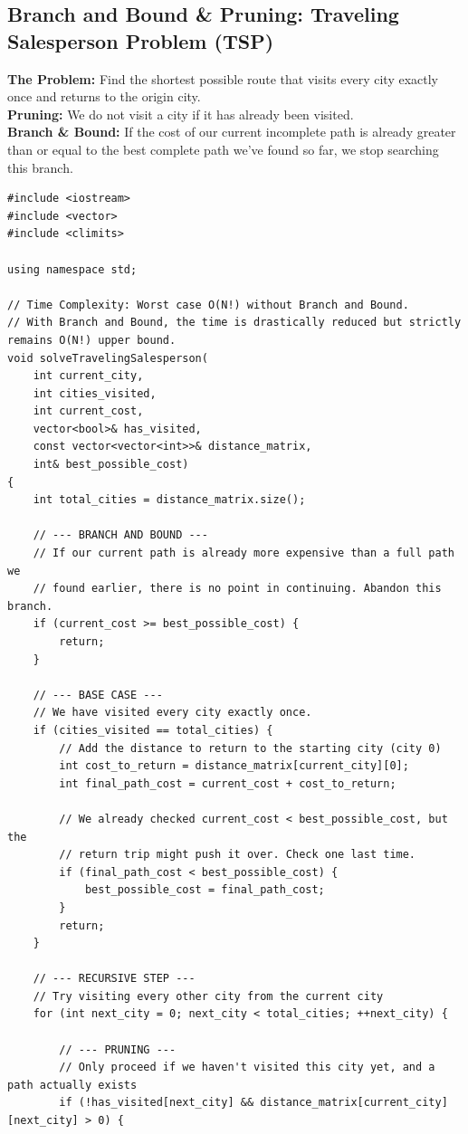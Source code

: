 \subsection{Branch and Bound \& Pruning: Traveling Salesperson Problem (TSP)}
\textbf{The Problem:} Find the shortest possible route that visits every city exactly once and returns to the origin city.
\\
\textbf{Pruning:} We do not visit a city if it has already been visited.
\\
\textbf{Branch \& Bound:} If the cost of our current incomplete path is already greater than or equal to the best complete path we've found so far, we stop searching this branch.

\begin{lstlisting}
#include <iostream>
#include <vector>
#include <climits>

using namespace std;

// Time Complexity: Worst case O(N!) without Branch and Bound.
// With Branch and Bound, the time is drastically reduced but strictly remains O(N!) upper bound.
void solveTravelingSalesperson(
    int current_city, 
    int cities_visited, 
    int current_cost, 
    vector<bool>& has_visited, 
    const vector<vector<int>>& distance_matrix, 
    int& best_possible_cost) 
{
    int total_cities = distance_matrix.size();
    
    // --- BRANCH AND BOUND ---
    // If our current path is already more expensive than a full path we 
    // found earlier, there is no point in continuing. Abandon this branch.
    if (current_cost >= best_possible_cost) {
        return;
    }

    // --- BASE CASE ---
    // We have visited every city exactly once.
    if (cities_visited == total_cities) {
        // Add the distance to return to the starting city (city 0)
        int cost_to_return = distance_matrix[current_city][0];
        int final_path_cost = current_cost + cost_to_return;
        
        // We already checked current_cost < best_possible_cost, but the 
        // return trip might push it over. Check one last time.
        if (final_path_cost < best_possible_cost) {
            best_possible_cost = final_path_cost;
        }
        return;
    }

    // --- RECURSIVE STEP ---
    // Try visiting every other city from the current city
    for (int next_city = 0; next_city < total_cities; ++next_city) {
        
        // --- PRUNING ---
        // Only proceed if we haven't visited this city yet, and a path actually exists
        if (!has_visited[next_city] && distance_matrix[current_city][next_city] > 0) {
            

\end{lstlisting}
